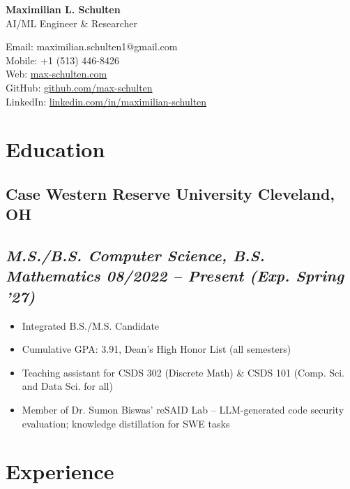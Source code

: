 \documentclass[10pt]{article} %
\begin{document}
\begin{center}
	\begin{minipage}{0.58\textwidth}
		{\huge\bfseries
			Maximilian L. Schulten
		} \\ \medskip
		AI/ML Engineer \& Researcher
	\end{minipage} \hfill
	\begin{minipage}{0.38\textwidth}
		\raggedleft
		Email: maximilian.schulten1@gmail.com \\
		Mobile: +1 (513) 446-8426 \\
		Web: \href{https://max-schulten.com}{max-schulten.com} \\
		GitHub: \href{https://github.com/max-schulten}{github.com/max-schulten} \\
		LinkedIn: \href{https://www.linkedin.com/in/maximilian-schulten-b78099271/}{linkedin.com/in/maximilian-schulten}
	\end{minipage}
\end{center}

\section{Education}
\subsection{Case Western Reserve University \hfill Cleveland, OH}
\subsection{\normalfont\itshape M.S./B.S. Computer Science, B.S. Mathematics \hfill 08/2022 -- Present (Exp. Spring '27)}
\begin{itemize}
	\item Integrated B.S./M.S. Candidate
	\item Cumulative GPA: 3.91, Dean's High Honor List (all semesters)
	\item Teaching assistant for CSDS 302 (Discrete Math) \& CSDS 101 (Comp. Sci. and Data Sci. for all)
	\item Member of Dr. Sumon Biswas' reSAID Lab -- LLM-generated code security evaluation; knowledge distillation for SWE tasks
\end{itemize}

\section{Experience}
\end{document}
